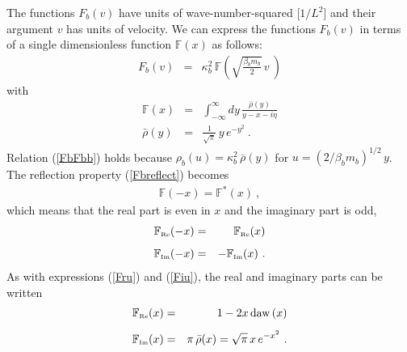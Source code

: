 \documentclass[preprint,12pt,eqsecnum,nofootinbib,amsmath,amssymb]{revtex4}
\newcommand{\smRe}{{\rm\scriptscriptstyle Re}}
\newcommand{\smIm}{{\rm\scriptscriptstyle Im}}
\begin{document}
{{The functions $F_b(v)$ have units of wave-number-squared 
[$1/L^2$] and their argument $v$ has units of velocity.
We can express the functions $F_b(v)$ in terms of a single
dimensionless function $\mathbb F(x)$ as follows:
\begin{eqnarray}
  F_b(v) 
  &=& 
  \kappa_b^2 \,\mathbb{F}\left(
  \sqrt{\frac{\beta_b m_b}{2}}\, v ~ \right)
\label{FbFbb}
\end{eqnarray}
with
\begin{eqnarray}
  \mathbb{F}(x) 
  &=& 
  \int_{-\infty}^\infty dy\, \frac{\bar\rho(y)}{y - x - i \eta} 
\\[5pt]
  \bar\rho(y)&=& \frac{1}{\sqrt{\pi}}\,y\,e^{-y^2}  \ .
\end{eqnarray}
Relation (\ref{FbFbb}) holds because $\rho_b(u) = \kappa_b^2\,\bar
\rho(y)$ for $u=(2/\beta_b m_b)^{1/2}\, y$.  The reflection property
(\ref{Fbreflect}) becomes
\begin{eqnarray}
  \mathbb{F}(-x) = \mathbb{F}^*(x) \  ,
\label{Freflect}
\end{eqnarray}
which means that the real part is even in $x$ and the imaginary
part is odd,
\begin{eqnarray}
  \mathbb{F}_\smRe(-x) &=& \phantom{-}\mathbb{F}_\smRe(x)
\\[5pt]
  \mathbb{F}_\smIm(-x) &=& -\mathbb{F}_\smIm(x) \ .
\end{eqnarray}
As with expressions (\ref{Fru}) and (\ref{Fiu}), the real and
imaginary parts can be written
\begin{eqnarray}
  \mathbb{F}_\smRe(x)
  &=& 
  1 - 2 x\,  {\rm daw}\left(x  \right) 
\label{FbarRe}
\\[5pt]
  \mathbb{F}_\smIm(x)
  &=&
  \pi\,  \bar\rho(x)  
  =
  \sqrt{\pi}\, x\, e^{-x^2}\ .
\label{FbarIm}
\end{eqnarray}



}}
\end{document}
